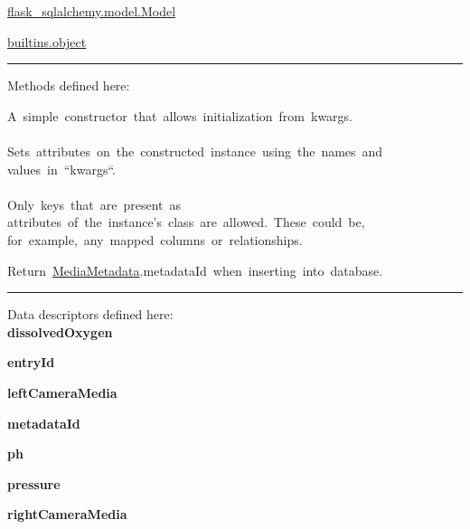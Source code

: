 \begin{longtable}[]
\begin{minipage}[t]{\linewidth}
\begin{longtable}[]
\begin{minipage}[t]{\linewidth}
\begin{description}
\href{flask_sqlalchemy.model.html\#Model}{flask\_sqlalchemy.model.Model}

\href{builtins.html\#object}{builtins.object}
\end{description}

\begin{center}\rule{0.5\linewidth}{0.5pt}\end{center}

Methods defined here:\\

\begin{description}
\tightlist
\item[\protect\hypertarget{MediaMetadata-__init__}{}{\textbf{\_\_init\_\_}}(self,
**kwargs)]
{A~simple~constructor~that~allows~initialization~from~kwargs.\\
\hspace*{0.333em}\\
Sets~attributes~on~the~constructed~instance~using~the~names~and\\
values~in~``kwargs``.\\
\hspace*{0.333em}\\
Only~keys~that~are~present~as\\
attributes~of~the~instance's~class~are~allowed.~These~could~be,\\
for~example,~any~mapped~columns~or~relationships.}
\end{description}

\begin{description}
\tightlist
\item[\protect\hypertarget{MediaMetadata-__repr__}{}{\textbf{\_\_repr\_\_}}(self)]
{Return~\protect\hyperlink{MediaMetadata}{MediaMetadata}.metadataId~when~inserting~into~database.}
\end{description}

\begin{center}\rule{0.5\linewidth}{0.5pt}\end{center}

Data descriptors defined here:\\

\textbf{dissolvedOxygen}

\textbf{entryId}

\textbf{leftCameraMedia}

\textbf{metadataId}

\textbf{ph}

\textbf{pressure}

\textbf{rightCameraMedia}


\end{minipage}
\end{longtable}
\end{minipage}
\end{longtable}
